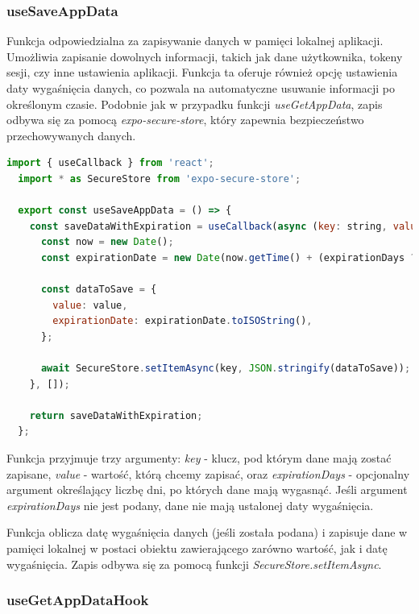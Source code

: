 \subsubsection{useSaveAppData} 

Funkcja odpowiedzialna za zapisywanie danych w pamięci lokalnej aplikacji. Umożliwia zapisanie dowolnych informacji, takich jak dane użytkownika, tokeny sesji, czy inne ustawienia aplikacji. Funkcja ta oferuje również opcję ustawienia daty wygaśnięcia danych, co pozwala na automatyczne usuwanie informacji po określonym czasie. Podobnie jak w przypadku funkcji \textit{useGetAppData}, zapis odbywa się za pomocą \textit{expo-secure-store}, który zapewnia bezpieczeństwo przechowywanych danych.

\begin{lstlisting}[language=JavaScript, caption=useSaveAppDataHook, label=lst:hook]
  import { useCallback } from 'react';
  import * as SecureStore from 'expo-secure-store';
  
  export const useSaveAppData = () => {
    const saveDataWithExpiration = useCallback(async (key: string, value: string, expirationDays?: number) => {
      const now = new Date();
      const expirationDate = new Date(now.getTime() + (expirationDays ? expirationDays * 24 * 60 * 60 * 1000 : 0));

      const dataToSave = {
        value: value,
        expirationDate: expirationDate.toISOString(),
      };

      await SecureStore.setItemAsync(key, JSON.stringify(dataToSave));
    }, []);

    return saveDataWithExpiration;
  };
\end{lstlisting}
    
Funkcja przyjmuje trzy argumenty: \textit{key} - klucz, pod którym dane mają zostać zapisane, \textit{value} - wartość, którą chcemy zapisać, oraz \textit{expirationDays} - opcjonalny argument określający liczbę dni, po których dane mają wygasnąć. Jeśli argument \textit{expirationDays} nie jest podany, dane nie mają ustalonej daty wygaśnięcia. 

Funkcja oblicza datę wygaśnięcia danych (jeśli została podana) i zapisuje dane w pamięci lokalnej w postaci obiektu zawierającego zarówno wartość, jak i datę wygaśnięcia. Zapis odbywa się za pomocą funkcji \textit{SecureStore.setItemAsync}.

\subsubsection{useGetAppDataHook}

